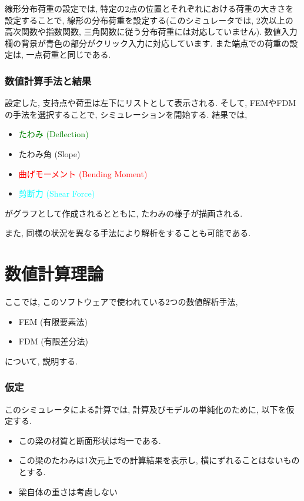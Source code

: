 \documentclass{jsarticle}
\begin{document}
線形分布荷重の設定では, 特定の2点の位置とそれぞれにおける荷重の大きさを設定することで, 線形の分布荷重を設定する(このシミュレータでは, 2次以上の高次関数や指数関数, 三角関数に従う分布荷重には対応していません). 数値入力欄の背景が青色の部分がクリック入力に対応しています. また端点での荷重の設定は, 一点荷重と同じである. 

\section{数値計算手法と結果}
設定した, 支持点や荷重は左下にリストとして表示される. そして, FEMやFDMの手法を選択することで, シミュレーションを開始する. 結果では, 
\begin{itemize}
\item \textcolor{green}{たわみ (Deflection)}
\item たわみ角 (Slope)
\item \textcolor{red}{曲げモーメント (Bending Moment)}
\item \textcolor{cyan}{剪断力 (Shear Force)}
\end{itemize}
がグラフとして作成されるとともに, たわみの様子が描画される. 

また, 同様の状況を異なる手法により解析をすることも可能である.


\newpage

\part{数値計算理論}
ここでは, このソフトウェアで使われている2つの数値解析手法,
\begin{itemize}
\item FEM (有限要素法)
\item FDM (有限差分法)
\end{itemize}
について, 説明する. 
\newpage

\section{仮定}
このシミュレータによる計算では, 計算及びモデルの単純化のために, 以下を仮定する.
\begin{itemize}
\item この梁の材質と断面形状は均一である.
\item この梁のたわみは1次元上での計算結果を表示し, 横にずれることはないものとする.
\item 梁自体の重さは考慮しない
\end{itemize}
\end{document}
